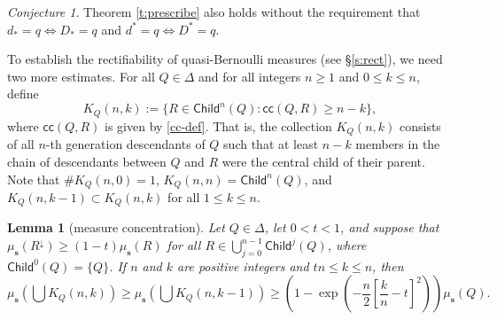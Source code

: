 \documentclass[12pt]{amsart}
\newtheorem{lemma}[theorem]{Lemma}
\theoremstyle{definition}
\theoremstyle{remark}
\newtheorem{conjecture}[theorem]{Conjecture}
\newcommand{\muse}{\mu_{\mathbf{s}}}
\newcommand{\Child}{\mathsf{Child}}
\numberwithin{figure}{section}
\numberwithin{equation}{section}
\begin{document}
\begin{conjecture} \label{all-d} Theorem \ref{t:prescribe} also holds without the requirement that $d_*=q\Leftrightarrow D_*=q$ and $d^*=q\Leftrightarrow D^*=q$.\end{conjecture}

To establish the rectifiability of quasi-Bernoulli measures (see \S\ref{s:rect}), we need two more estimates.
For all $Q\in\Delta$ and for all integers $n\geq 1$ and $0\leq k\leq n$, define \begin{equation} \label{KQ}
K_Q(n,k):=\{R\in\Child^n(Q):\mathsf{cc}(Q,R)\geq n-k\},\end{equation} where $\mathsf{cc}(Q,R)$ is given by \eqref{cc-def}. That is, the collection $K_Q(n,k)$ consists of all $n$-th generation descendants of $Q$ such that at least $n-k$ members in the chain of descendants between $Q$ and $R$ were the central child of their parent. Note that $\#K_Q(n,0)=1$, $K_Q(n,n)=\Child^n(Q)$, and $K_Q(n,k-1)\subset K_Q(n,k)$ for all $1\leq k\leq n$.

\begin{lemma}[measure concentration] \label{l:measure-t} Let $Q\in\Delta$, let $0<t<1$, and suppose that $\muse(R^\downarrow)\geq (1-t)\muse(R)$ for all $R\in\bigcup_{j=0}^{n-1}\Child^j(Q)$, where $\Child^0(Q)=\{Q\}$. If $n$ and $k$ are positive integers and $tn\leq k\leq n$, then \begin{equation}\label{measure-bound-t} \muse\left(\textstyle\bigcup K_Q(n,k)\right)\geq\muse\left(\textstyle\bigcup K_Q(n,k-1)\right)\geq \left(1-\exp\left(-\frac{n}{2}\left[\frac{k}{n}-t\right]^2\right)\right)\muse(Q).\end{equation}\end{lemma}
\end{document}
